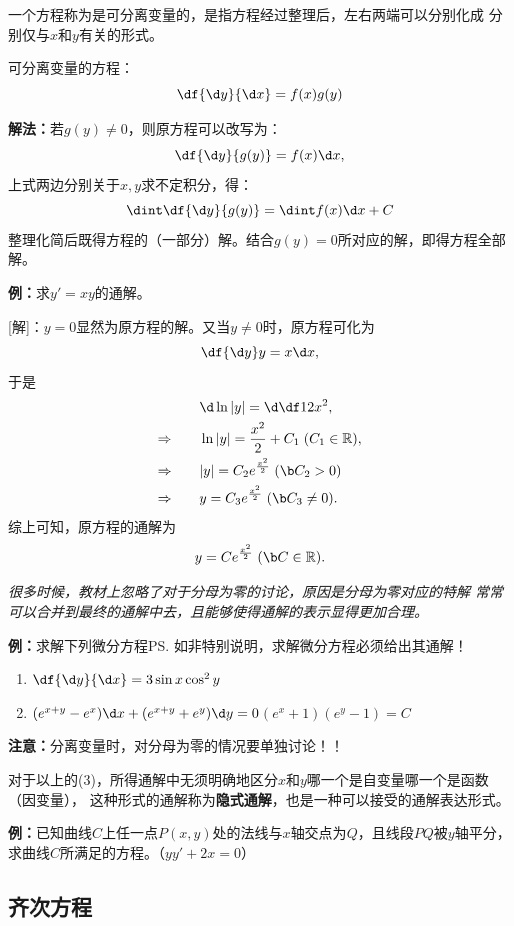 一个方程称为是可分离变量的，是指方程经过整理后，左右两端可以分别化成
分别仅与$x$和$y$有关的形式。

\begin{thx}
	{可分离变量的方程：}
	$$\df{\d y}{\d x}=f(x)g(y)$$ 

	{\bf 解法：}若$g(y)\ne 0$，则原方程可以改写为：
	$$\df{\d y}{g(y)}=f(x)\d x,$$ 
	上式两边分别关于$x,y$求不定积分，得：
	$$\dint\df{\d y}{g(y)}=\dint f(x)\d x+C$$ 
	整理化简后既得方程的（一部分）解。结合$g(y)=0$所对应的解，即得方程全部解。
\end{thx}

{\bf 例：}求$y'=xy$的通解。
	
[解]：$y=0$显然为原方程的解。又当$y\ne0$时，原方程可化为
$$\df{\d y}y=x\d x,$$
于是
\begin{align*}
	&  \quad\d\ln|y|=\d\df12x^2,\\
	\Rightarrow\quad & \quad\ln|y|={\frac{x^2}2}+C_1\;(C_1\in\mathbb{R}),\\
	\Rightarrow\quad & \quad|y|=C_2e^{\frac{x^2}2}\;({\b C_2>0})\\
	\Rightarrow\quad & \quad y=C_3e^{\frac{x^2}2}\;({\b C_3\ne0}).
\end{align*}
综上可知，原方程的通解为
$$y=Ce^{\frac{x^2}2}\;({\b C\in\mathbb{R}}).$$\fin

{\b\it 很多时候，教材上忽略了对于分母为零的讨论，原因是分母为零对应的特解
常常可以合并到最终的通解中去，且能够使得通解的表示显得更加合理。}

{\bf 例：}求解下列微分方程\ps{如非特别说明，求解微分方程必须给出其通解！}
\begin{enumerate}[(1)]
  \setlength{\itemindent}{1cm}
  \item $\df{\d y}{\d x}=3\sin x\cos^2 y$
  \item $(e^{x+y}-e^x)\d x+(e^{x+y}+e^y)\d y=0$\hfill $(e^x+1)(e^y-1)=C$
\end{enumerate}

{\bf 注意：}分离变量时，对分母为零的情况要单独讨论！！

对于以上的(3)，所得通解中无须明确地区分$x$和$y$哪一个是自变量哪一个是函数（因变量），
这种形式的通解称为{\bf 隐式通解}，也是一种可以接受的通解表达形式。

{\bf 例：}已知曲线$C$上任一点$P(x,y)$处的法线与$x$轴交点为$Q$，且线段$PQ$被$y$轴平分，
求曲线$C$所满足的方程。\hfill（$yy'+2x=0$）

\subsection{齐次方程}

